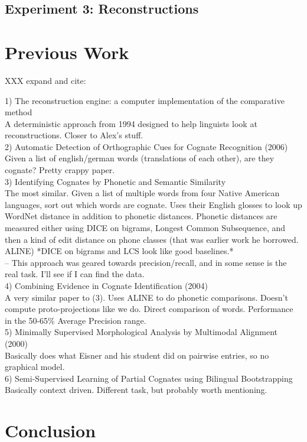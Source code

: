 \documentclass[11pt,a4paper]{article}
\begin{document}
\subsection{Experiment 3: Reconstructions}


\section{Previous Work}
XXX expand and cite:

1) The reconstruction engine: a computer implementation of the
comparative method\\
  A deterministic approach from 1994 designed to help linguists look
at reconstructions. Closer to Alex's stuff. \\
2) Automatic Detection of Orthographic Cues for Cognate Recognition (2006) \\
  Given a list of english/german words (translations of each other),
are they cognate? Pretty crappy paper.\\
3) Identifying Cognates by Phonetic and Semantic Similarity \\
  The most similar. Given a list of multiple words from four Native
American languages, sort out which words are cognate. Uses their
English glosses to look up WordNet distance in addition to phonetic
distances. Phonetic distances are measured either using DICE on
bigrams, Longest Common Subsequence, and then a kind of edit distance
on phone classes (that was earlier work he borrowed. ALINE) *DICE on
bigrams and LCS look like good baselines.*\\
  -- This approach was geared towards precision/recall, and in some
sense is the real task. I'll see if I can find the data. \\
4)  Combining Evidence in Cognate Identification (2004) \\
  A very similar paper to (3). Uses ALINE to do phonetic comparisons.
Doesn't compute proto-projections like we do. Direct comparison of
words. Performance in the 50-65\% Average Precision range.\\
5) Minimally Supervised Morphological Analysis by Multimodal Alignment (2000) \\
  Basically does what Eisner and his student did on pairwise entries,
so no graphical model.\\
6) Semi-Supervised Learning of Partial Cognates using Bilingual Bootstrapping
  Basically context driven. Different task, but probably worth mentioning.

\section{Conclusion}


\end{document}
